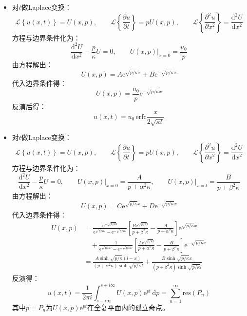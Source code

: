 \documentclass[a4paper,fontset=windows]{ctexart}
\begin{document}
\begin{itemize}

\item[1.]
对$t$做Laplace变换：
\[
\mathscr{L}\left\{u(x,t)\right\} = U(x,p),\qquad \mathscr{L}\left\{\frac{\partial u}{\partial t}\right\} = pU(x,p),\qquad \mathscr{L}\left\{\frac{\partial^2 u}{\partial x^2}\right\} = \frac{\mathrm{d}^2U}{\mathrm{d}x^2}
\]
方程与边界条件化为：
\[
\frac{\mathrm{d}^2U}{\mathrm{d}x^2} - \frac{p}{\kappa}U = 0,\qquad \left.U(x,p)\right|_{x=0} = \frac{u_0}{p}
\]
由方程解出：
\[
U(x,p) = A\mathrm{e}^{\sqrt{p/\kappa}x} + B\mathrm{e}^{-\sqrt{p/\kappa}x}
\]
代入边界条件得：
\[
U(x,p) = \frac{u_0}{p}\mathrm{e}^{-\sqrt{p/\kappa}x}
\]
反演后得：
\[
u(x,t) = u_0\,\mathrm{erfc}\frac{x}{2\sqrt{\kappa t}}
\]

\bigskip
\item[3.]
对$t$做Laplace变换：
\[
\mathscr{L}\left\{u(x,t)\right\} = U(x,p),\qquad \mathscr{L}\left\{\frac{\partial u}{\partial t}\right\} = pU(x,p),\qquad \mathscr{L}\left\{\frac{\partial^2 u}{\partial x^2}\right\} = \frac{\mathrm{d}^2U}{\mathrm{d}x^2}
\]
方程与边界条件化为：
\[
\frac{\mathrm{d}^2U}{\mathrm{d}x^2} - \frac{p}{\kappa}U = 0,\qquad \left.U(x,p)\right|_{x=0} = \frac{A}{p+\alpha^2\kappa},\qquad \left.U(x,p)\right|_{x=l} = \frac{B}{p+\beta^2\kappa}
\]
由方程解出：
\[
U(x,p) = C\mathrm{e}^{\sqrt{p/\kappa}x} + D\mathrm{e}^{-\sqrt{p/\kappa}x}
\]
代入边界条件得：
\begin{align*}
U(x,p)
&= \frac{\mathrm{e}^{-\sqrt{p/\kappa}l}}{\mathrm{e}^{\sqrt{p/\kappa}l} - \mathrm{e}^{-\sqrt{p/\kappa}l}}\left[\frac{B\mathrm{e}^{\sqrt{p/\kappa}l}}{p+\beta^2\kappa} - \frac{A}{p+\alpha^2\kappa}\right]\mathrm{e}^{\sqrt{p/\kappa}x} \\
&\quad + \frac{1}{\mathrm{e}^{\sqrt{p/\kappa}l} - \mathrm{e}^{-\sqrt{p/\kappa}l}}\left[\frac{A\mathrm{e}^{\sqrt{p/\kappa}l}}{p+\alpha^2\kappa} - \frac{B}{p+\beta^2\kappa}\right]\mathrm{e}^{-\sqrt{p/\kappa}x} \\
&= \frac{A\sinh\sqrt{p/\kappa}(l-x)}{(p+\alpha^2\kappa)\sinh\sqrt{p/\kappa}l} + \frac{B\sinh\sqrt{p/\kappa}x}{(p+\beta^2\kappa)\sinh\sqrt{p/\kappa}l}
\end{align*}
反演得：
\[
u(x,t) = \frac{1}{2\pi i}\int_{s-i\infty}^{s+i\infty}U(x,p)\mathrm{e}^{pt}\,\mathrm{d}p = \sum_{n=1}^{\infty}\mathrm{res}(P_n)
\]
其中$p = P_n$为$U(x,p)\mathrm{e}^{pt}$在全复平面内的孤立奇点。


\end{itemize}
\end{document}
